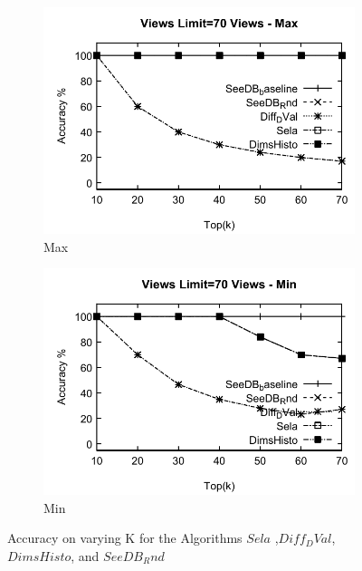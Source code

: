   \begin{figure}[h]
  \centering
  \begin{subfigure}[b]{0.42\textwidth}
    \includegraphics[width=\textwidth]{MaxA1.pdf}
    \caption{Max   }
        \label{fig:MaxA1}%
  \end{subfigure}
  \begin{subfigure}[b]{0.42\textwidth}
    \includegraphics[width=\textwidth]{MinA1.pdf}
     \caption{Min  }
        \label{fig:MinA1}
  \end{subfigure}
  
  \caption{Accuracy on varying K for the Algorithms $Sela$ ,$Diff_DVal$, $DimsHisto$, and $SeeDB_Rnd$}
\end{figure}

